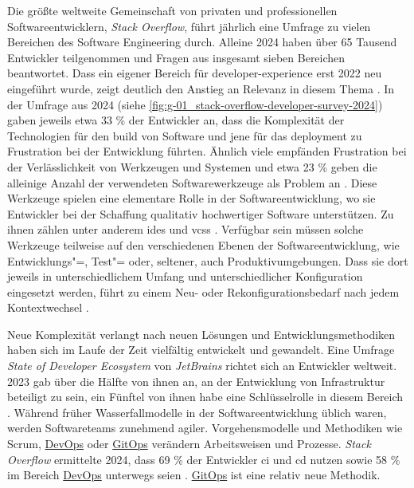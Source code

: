 Die größte weltweite Gemeinschaft von privaten und professionellen Softwareentwicklern, \textit{Stack Overflow}, führt jährlich eine Umfrage zu vielen Bereichen des Software Engineering durch. Alleine 2024 haben über 65 Tausend Entwickler teilgenommen und Fragen aus insgesamt sieben Bereichen beantwortet. Dass ein eigener Bereich für \Gls{developer-experience} erst 2022 neu eingeführt wurde, zeigt deutlich den Anstieg an Relevanz in diesem Thema \cite{212:Developer-Survey}. In der Umfrage aus 2024 (siehe \autoref{fig:g-01_stack-overflow-developer-survey-2024}) gaben jeweils etwa 33 \% der Entwickler an, dass die Komplexität der Technologien für den \Gls{build} von Software und jene für das \Gls{deployment} zu Frustration bei der Entwicklung führten. Ähnlich viele empfänden Frustration bei der Verlässlichkeit von Werkzeugen und Systemen und etwa 23 \% geben die alleinige Anzahl der verwendeten Softwarewerkzeuge als Problem an \cite{206:Developer-Survey-2024}. Diese Werkzeuge spielen eine elementare Rolle in der Softwareentwicklung, wo sie Entwickler bei der Schaffung qualitativ hochwertiger Software unterstützen. Zu ihnen zählen unter anderem \glspl{ide} und \glspl{vcs} \cite{014:Managing-Container-based-Software-Development-Environments}. Verfügbar sein müssen solche Werkzeuge teilweise auf den verschiedenen Ebenen der Softwareentwicklung, wie Entwicklungs"=, Test"= oder, seltener, auch Produktivumgebungen. Dass sie dort jeweils in unterschiedlichem Umfang und unterschiedlicher Konfiguration eingesetzt werden, führt zu einem Neu- oder Rekonfigurationsbedarf nach jedem Kontextwechsel \cite{003:Infrastructure-from-Code}.

Neue Komplexität verlangt nach neuen Lösungen und Entwicklungsmethodiken haben sich im Laufe der Zeit vielfältig entwickelt und gewandelt. Eine Umfrage \textit{State of Developer Ecosystem} von \textit{JetBrains} richtet sich an Entwickler weltweit. 2023 gab über die Hälfte von ihnen an, an der Entwicklung von Infrastruktur beteiligt zu sein, ein Fünftel von ihnen habe eine Schlüsselrolle in diesem Bereich \cite{207:Developer-Ecosystem}. Während früher Wasserfallmodelle in der Softwareentwicklung üblich waren, werden Softwareteams zunehmend agiler. Vorgehensmodelle und Methodiken wie Scrum, \hyperref[sec:03-01_devops]{DevOps} oder \hyperref[sec:03-03_gitops]{GitOps} verändern Arbeitsweisen und Prozesse. \textit{Stack Overflow} ermittelte 2024, dass 69 \% der Entwickler \gls{ci} und \gls{cd} nutzen sowie 58 \% im Bereich \hyperref[sec:03-01_devops]{DevOps} unterwegs seien \cite{206:Developer-Survey-2024}. \hyperref[sec:03-03_gitops]{GitOps} ist eine relativ neue Methodik.


